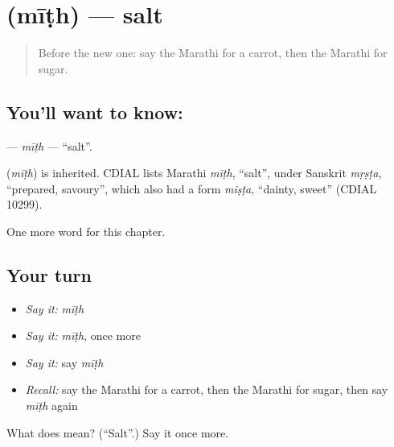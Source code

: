 \section[\texorpdfstring{\mr{मीठ} (mīṭh)}{मीठ (mīṭh)}]{ (mīṭh) — salt}

\label{lesson:MR-C86-mith}



\begin{quote}
Before the new one: say the Marathi for a carrot, then the Marathi for sugar.
\end{quote}

\subsection*{You'll want to know: }
\textbf{} — \emph{mīṭh} — \textquotedblleft{}salt\textquotedblright{}.

\begin{cousinweb}
\textbf{} (\emph{mīṭh}) is inherited. CDIAL lists Marathi \emph{mīṭh}, \textquotedblleft{}salt\textquotedblright{}, under Sanskrit \emph{mṛṣṭa}, \textquotedblleft{}prepared, savoury\textquotedblright{}, which also had a form \emph{miṣṭa}, \textquotedblleft{}dainty, sweet\textquotedblright{} (CDIAL 10299).
\end{cousinweb}

\begin{grammarlens}[title={What you've built}]
One more word for this chapter.
\end{grammarlens}

\subsection*{Your turn}
\begin{itemize}
\raggedright
  \item \emph{Say it:} \emph{mīṭh}
  \item \emph{Say it:} \emph{mīṭh}, once more
  \item \emph{Say it:} say \emph{mīṭh}
  \item \emph{Recall:} say the Marathi for a carrot, then the Marathi for sugar, then say \emph{mīṭh} again
\end{itemize}

\begin{tcolorbox}[breakable,colback=teal!4,colframe=teal!35!black,title={Before you move on}]
What does  mean? (\textquotedblleft{}Salt\textquotedblright{}.) Say it once more.
\end{tcolorbox}
